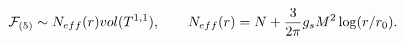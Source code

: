 \begin{equation}
\mathcal{F}_{(5)}\sim N_{eff}(r)vol(T^{1,1}), \qquad  N_{eff}(r) = N + {3\over 2\pi}g_sM^2\log(r/r_0).
\end{equation}

